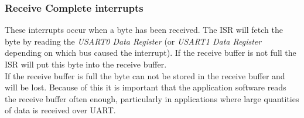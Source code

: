 \subsubsection{Receive Complete interrupts}
These interrupts occur when a byte has been received. The ISR will fetch the byte by reading the \emph{USART0 Data Register} (or \emph{USART1 Data Register} depending on which bus caused the interrupt). If the receive buffer is not full the ISR will put this byte into the receive buffer. \\
If the receive buffer is full the byte can not be stored in the receive buffer and will be lost. Because of this it is important that the application software reads the receive buffer often enough, particularly in applications where large quantities of data is received over UART.



